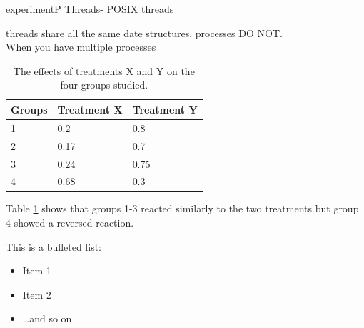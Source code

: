\documentclass[15pt,idxtotoc,hyperref,openany]{labbook} %
\begin{document}
experiment{P Threads- POSIX threads}





threads share all the same date structures, processes DO NOT.\\

When you have multiple processes


\begin{table}[H]
\begin{tabular}{l l l}
\toprule
\textbf{Groups} & \textbf{Treatment X} & \textbf{Treatment Y} \\
\toprule
1 & 0.2 & 0.8\\
2 & 0.17 & 0.7\\
3 & 0.24 & 0.75\\
4 & 0.68 & 0.3\\
\bottomrule
\end{tabular}
\caption{The effects of treatments X and Y on the four groups studied.}
\label{tab:treatments_xy}
\end{table}

Table \ref{tab:treatments_xy} shows that groups 1-3 reacted similarly to the two treatments but group 4 showed a reversed reaction.




This is a bulleted list:

\begin{itemize}
\item Item 1
\item Item 2
\item \ldots and so on
\end{itemize}



\lipsum[6]



\lipsum[7]
\end{document}
